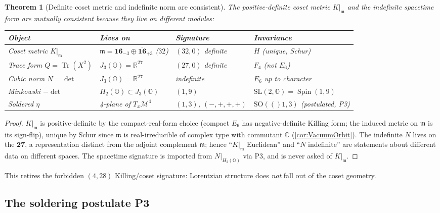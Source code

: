 \documentclass[11pt]{article}
\renewcommand{\arraystretch}{1.18}
\theoremstyle{plain}
\newtheorem{theorem}{Theorem}[section]
\theoremstyle{definition}
\theoremstyle{remark}
\newcommand{\SO}[1]{\mathrm{SO}(#1)}
\newcommand{\SL}{\mathrm{SL}}
\newcommand{\Spin}{\operatorname{Spin}}
\newcommand{\Tr}{\operatorname{Tr}}
\begin{document}
\begin{theorem}[Definite coset metric and indefinite norm are consistent]
\label{thm:spacetime:consistent}
The positive-definite coset metric $K|_{\mathfrak m}$ and the indefinite spacetime
form are mutually consistent because they live on different modules:
\begin{center}\renewcommand{\arraystretch}{1.25}
\begin{tabular}{@{}llll@{}}
\toprule
Object & Lives on & Signature & Invariance \\
\midrule
Coset metric $K|_{\mathfrak m}$ & $\mathfrak m=\mathbf{16}_{-3}\oplus\overline{\mathbf{16}}_{+3}$ ($32$) & $(32,0)$ definite & $H$ (unique, Schur)\\
Trace form $Q=\Tr(X^2)$ & $J_3(\mathbb O)=\mathbb R^{27}$ & $(27,0)$ definite & $F_4$ (\emph{not} $E_6$)\\
Cubic norm $N=\det$ & $J_3(\mathbb O)=\mathbb R^{27}$ & indefinite & $E_6$ up to character\\
Minkowski $-\det$ & $H_2(\mathbb O)\subset J_3(\mathbb O)$ & $(1,9)$ & $\SL(2,\mathbb O)=\Spin(1,9)$\\
Soldered $\eta$ & 4-plane of $T_x\mathcal M^4$ & $(1,3)$, $(-,+,+,+)$ & $\SO(1,3)$ (postulated, P3)\\
\bottomrule
\end{tabular}
\end{center}
\end{theorem}
\begin{proof}
$K|_{\mathfrak m}$ is positive-definite by the compact-real-form choice (compact $E_6$
has negative-definite Killing form; the induced metric on $\mathfrak m$ is its
sign-flip), unique by Schur since $\mathfrak m$ is real-irreducible of complex type with
commutant $\mathbb C$ (\autoref{cor:VacuumOrbit}). The indefinite $N$ lives on the
$\mathbf{27}$, a representation distinct from the adjoint complement $\mathfrak m$;
hence ``$K|_{\mathfrak m}$ Euclidean'' and ``$N$ indefinite'' are statements about
different data on different spaces. The spacetime signature is imported from
$N|_{H_2(\mathbb O)}$ via P3, and is never asked of $K|_{\mathfrak m}$.
\end{proof}

This retires the forbidden $(4,28)$ Killing/coset signature: Lorentzian structure does
\emph{not} fall out of the coset geometry.

\subsection{The soldering postulate P3}
\label{sec:spacetime:P3}
\end{document}
